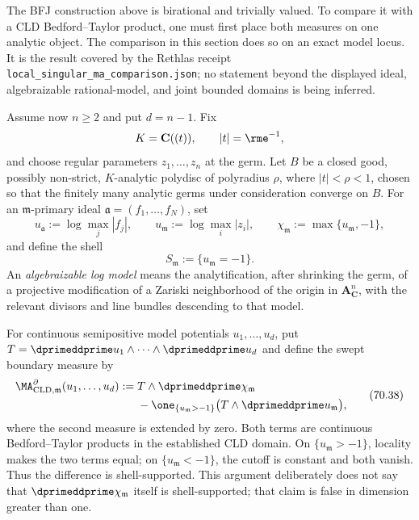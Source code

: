 The BFJ construction above is birational and trivially valued. To compare
it with a CLD Bedford--Taylor product, one must first place both measures on
one analytic object. The comparison in this section does so on an exact
model locus. It is the result covered by the Rethlas receipt
\texttt{local\_singular\_ma\_comparison.json}; no statement beyond the
displayed ideal, algebraizable rational-model, and joint bounded domains is
being inferred.

Assume now \(n\geq2\) and put \(d=n-1\). Fix
\[
 K=\mathbf C((t)),
 \qquad |t|=\rme^{-1},
\]
and choose regular parameters \(z_1,\ldots,z_n\) at the germ. Let \(B\) be
a closed good, possibly non-strict, \(K\)-analytic polydisc of polyradius
\(\rho\), where \(|t|<\rho<1\), chosen so that the finitely many analytic
germs under consideration converge on \(B\). For an
\(\mathfrak m\)-primary ideal \(\mathfrak a=(f_1,\ldots,f_N)\), set
\[
 u_{\mathfrak a}:=\log\max_j|f_j|,
 \qquad
 u_{\mathfrak m}:=\log\max_i|z_i|,
 \qquad
 \chi_{\mathfrak m}:=\max\{u_{\mathfrak m},-1\},
\tag{70.36}\label{eq:local-cld-model-functions}
\]
and define the shell
\[
                S_{\mathfrak m}:=\{u_{\mathfrak m}=-1\}.
\tag{70.37}\label{eq:local-cld-shell}
\]
An \emph{algebraizable log model} means the analytification, after
shrinking the germ, of a projective modification of a Zariski neighborhood
of the origin in \(\mathbf A^n_{\mathbf C}\), with the relevant divisors and
line bundles descending to that model.

For continuous semipositive model potentials \(u_1,\ldots,u_d\), put
\(T=\dprimeddprime u_1\wedge\cdots\wedge\dprimeddprime u_d\) and define
the swept boundary measure by
\[
 \begin{split}
 \MA^{\partial}_{\mathrm{CLD},\mathfrak m}(u_1,\ldots,u_d)
 :={}&T\wedge\dprimeddprime\chi_{\mathfrak m}\\
 &-\one_{\{u_{\mathfrak m}>-1\}}
       \bigl(T\wedge\dprimeddprime u_{\mathfrak m}\bigr),
 \end{split}
\tag{70.38}\label{eq:local-cld-swept-product}
\]
where the second measure is extended by zero. Both terms are continuous
Bedford--Taylor products in the established CLD domain. On
\(\{u_{\mathfrak m}>-1\}\), locality makes the two terms equal; on
\(\{u_{\mathfrak m}<-1\}\), the cutoff is constant and both vanish. Thus
the difference is shell-supported. This argument deliberately does not say
that \(\dprimeddprime\chi_{\mathfrak m}\) itself is shell-supported; that
claim is false in dimension greater than one.

